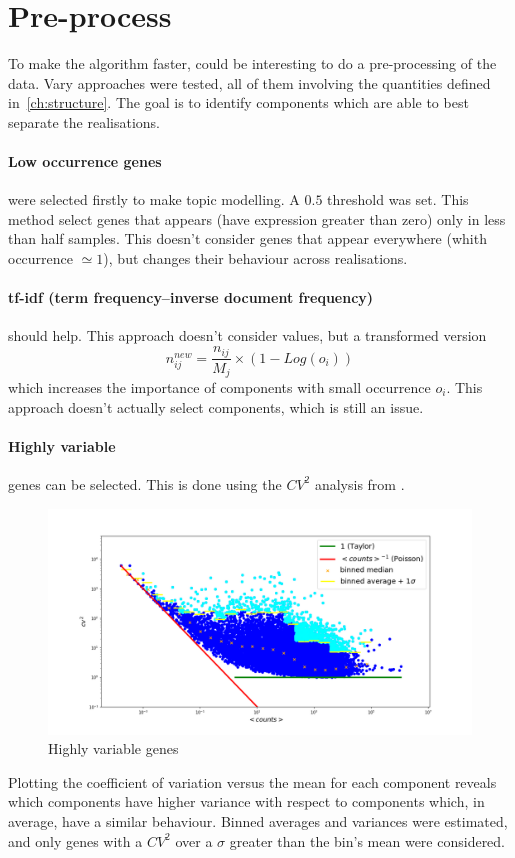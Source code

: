 \section{Pre-process}
To make the algorithm faster, could be interesting to do a pre-processing of the data.
Vary approaches were tested, all of them involving the quantities defined in~\ref{ch:structure}. The goal is to identify components which are able to best separate the realisations. 
\paragraph{Low occurrence genes} were selected firstly to make topic modelling. A  $0.5$ threshold was set. This method select genes that appears (have expression greater than zero) only in less than half samples. This doesn't consider genes that appear everywhere (whith occurrence $\simeq 1$), but changes their behaviour across realisations.

\paragraph{tf-idf (term frequency–inverse document frequency)} should help. This approach doesn't consider values, but a transformed version
\[
n^{new}_{ij}=\frac{n_{i j}}{M_j}\times \left(1-Log\left(o_i\right)\right)
\] which increases the importance of components with small occurrence $o_i$. This approach doesn't actually select components, which is still an issue.

\paragraph{Highly variable} genes can be selected. This is done using the $CV^2$ analysis from .
\begin{figure}[htb!]
    \centering
    \includegraphics[width=0.8\linewidth]{pictures/topic/cvmean_oversigma.png}
    \caption{Highly variable genes}
    \label{fig:topic/cvmean_oversigma}
\end{figure}
Plotting the coefficient of variation versus the mean for each component reveals which components have higher variance with respect to components which, in average, have a similar behaviour.
Binned averages and variances were estimated, and only genes with a $CV^2$ over a $\sigma$ greater than the bin's mean were considered.


